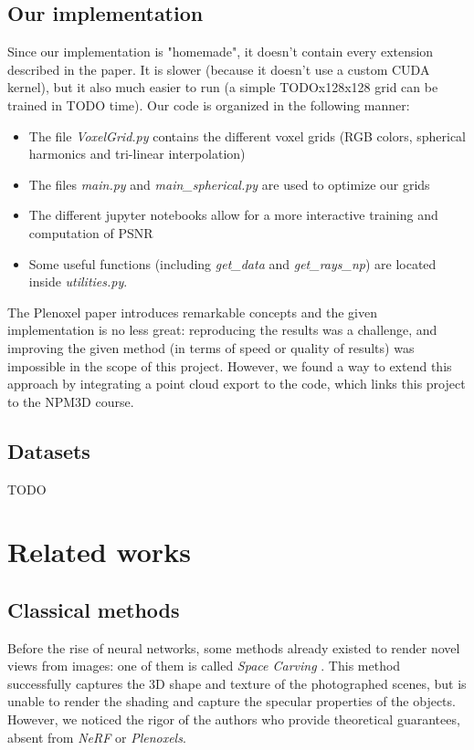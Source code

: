 \documentclass{article}
\begin{document}
\subsection{Our implementation}


Since our implementation is "homemade", it doesn't contain every extension described in the paper. It is slower (because it doesn't use a custom CUDA kernel), but it also much easier to run (a simple TODOx128x128 grid can be trained in TODO time). Our code is organized in the following manner:


\begin{itemize}
\item The file \textit{VoxelGrid.py} contains the different voxel grids (RGB colors, spherical harmonics and tri-linear interpolation) 
\item The files \textit{main.py} and \textit{main\_spherical.py} are used to optimize our grids
\item The different jupyter notebooks allow for a more interactive training and computation of PSNR
\item Some useful functions (including \textit{get\_data} and \textit{get\_rays\_np}) are located inside \textit{utilities.py}.
\end{itemize}

The Plenoxel paper introduces remarkable concepts and the given implementation is no less great: reproducing the results was a challenge, and improving the given method (in terms of speed or quality of results) was impossible in the scope of this project. However, we found a way to extend this approach by integrating a point cloud export to the code, which links this project to the NPM3D course.   

\subsection{Datasets}

TODO

\section{Related works}



\subsection{Classical methods}

Before the rise of neural networks, some methods already existed to render novel views from images: one of them is called \textit{Space Carving} \cite{spacecarving}. This method successfully captures the 3D shape and texture of the photographed scenes, but is unable to render the shading and capture the specular properties of the objects. However, we noticed the rigor of the authors who provide theoretical guarantees, absent from \textit{NeRF} or \textit{Plenoxels}.
\end{document}
